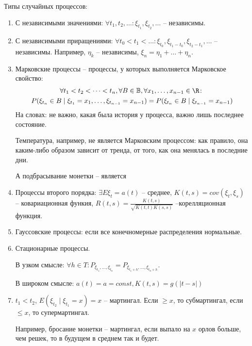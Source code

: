 Типы случайных процессов:
\begin{enumerate}
\item С независимыми значениями: $\forall t_1, t_2, \dots \colon \xi_{t_1}, \xi_{t_2}, \dots$ -- независимы.

\item С независимыми приращениями: $\forall t_0 < t_1 < \dots \colon \xi_{t_0}, \xi_{t_1 - t_0}, \xi_{t_2 - t_1}, \dots$ -- независимы.
Например, $\eta_k$ -- независимы, $\xi_n = \eta_1 + \dots + \eta_n$.

\item Марковские процессы -- процессы, у которых выполняется Марковское свойство: 
    \begin{gather*}
        \forall t_1 < t_2 < \dots < t_n, \forall B \in \mathbb{B}, \forall x_1, \dots, x_{n-1} \in \R \colon \\
        P(\xi_{t_n} \in B \mid \xi_{t_1} = x_1, \dots, \xi_{t_{n-1}} = x_{n-1}) = P(\xi_{t_n} \in B \mid \xi_{t_{n-1}} = x_{n-1})
    \end{gather*}
На словах: не важно, какая была история у процесса, важно лишь последнее состояние.
\begin{exmp}
Температура, например, не является Марковским процессом: как правило, она каким-либо образом зависит от тренда, от того, как она менялась в последние дни.
\end{exmp}                                                                                                                                                                                 
\begin{exmp}
А подбрасывание монетки -- является
\end{exmp}
\item Процессы второго порядка: $\exists E \xi_t = a(t)$ -- среднее, $K(t, s) = cov(\xi_t, \xi_s)$ -- ковариационная функия, $R(t, s) = \frac{K(t, s)}{\sqrt{K(t, t)K(s, s)}}$ --корелляционная функция.

\item Гауссовские процессы: если все конечномерные распределения нормальные.

\item Стационарные процессы. 

В узком смысле: $\forall h \in T\colon P_{\xi_{t_1}, \dots, \xi_{t_n}} = P_{\xi_{t_1 + h}, \dots, \xi_{t_n + h}}$.

В широком смысле: $a(t) = a = const, K(t, s) = g(|t - s|)$

\item $t_1 < t_2$, $E(\xi_{t_2} \mid \xi_{t_1} = x) = x$ -- мартингал. Если $\geq x$, то субмартингал, если $\leq x$, то супермартингал.
\begin{exmp}
Например, бросание монетки -- мартингал, если выпало на $x$ орлов больше, чем решек, то в будущем в среднем так и будет.
\end{exmp}

\end{enumerate}

